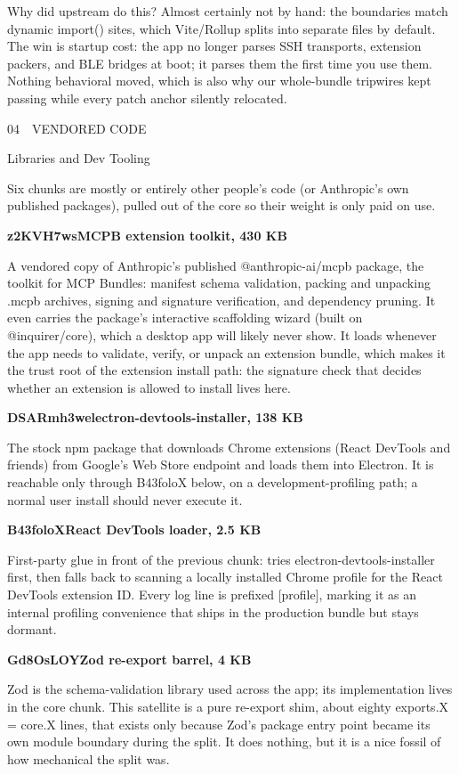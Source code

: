\documentclass[11pt]{article}
\newcommand{\mono}{\ttfamily}
\newcommand{\reppar}[1]{{\fontsize{10.5}{15.2}\selectfont #1\par}\vspace{8pt}}
\newcommand{\code}[1]{{\mono\small #1}}
\newcommand{\reportsection}[3]{%
  \vspace{14pt}%
  {\mono\footnotesize\color{baseMid}\addfontfeatures{LetterSpace=8.0}\MakeUppercase{#1\, \textbullet\, #2}}\par
  \vspace{3pt}%
  {\heavy\fontsize{17}{19}\selectfont\color{base900} #3\par}
  \vspace{4pt}{\color{accent}\hrule height 1.6pt}\vspace{9pt}%
}
\newcommand{\chunkhead}[2]{%
  \vspace{4pt}%
  {\fontsize{10.5}{15.2}\selectfont
   {\mono\bfseries\color{accentink}#1}\;\textbullet\;\textbf{#2}\par}
  \vspace{2pt}}
\begin{document}
\reppar{Why did upstream do this? Almost certainly not by hand: the boundaries match dynamic \code{import()} sites, which Vite/Rollup splits into separate files by default. The win is startup cost: the app no longer parses SSH transports, extension packers, and BLE bridges at boot; it parses them the first time you use them. Nothing behavioral moved, which is also why our whole-bundle tripwires kept passing while every patch anchor silently relocated.}

\reportsection{04}{Vendored Code}{Libraries and Dev Tooling}

\reppar{Six chunks are mostly or entirely other people's code (or Anthropic's own published packages), pulled out of the core so their weight is only paid on use.}

\chunkhead{z2KVH7ws}{MCPB extension toolkit, 430 KB}
\reppar{A vendored copy of Anthropic's published \code{@anthropic-ai/mcpb} package, the toolkit for MCP Bundles: manifest schema validation, packing and unpacking \code{.mcpb} archives, signing and signature verification, and dependency pruning. It even carries the package's interactive scaffolding wizard (built on \code{@inquirer/core}), which a desktop app will likely never show. It loads whenever the app needs to validate, verify, or unpack an extension bundle, which makes it the trust root of the extension install path: the signature check that decides whether an extension is allowed to install lives here.}

\chunkhead{DSARmh3w}{electron-devtools-installer, 138 KB}
\reppar{The stock npm package that downloads Chrome extensions (React DevTools and friends) from Google's Web Store endpoint and loads them into Electron. It is reachable only through \code{B43foloX} below, on a development-profiling path; a normal user install should never execute it.}

\chunkhead{B43foloX}{React DevTools loader, 2.5 KB}
\reppar{First-party glue in front of the previous chunk: tries \code{electron-devtools-installer} first, then falls back to scanning a locally installed Chrome profile for the React DevTools extension ID. Every log line is prefixed \code{[profile]}, marking it as an internal profiling convenience that ships in the production bundle but stays dormant.}

\chunkhead{Gd8OsLOY}{Zod re-export barrel, 4 KB}
\reppar{Zod is the schema-validation library used across the app; its implementation lives in the core chunk. This satellite is a pure re-export shim, about eighty \code{exports.X = core.X} lines, that exists only because Zod's package entry point became its own module boundary during the split. It does nothing, but it is a nice fossil of how mechanical the split was.}
\end{document}
